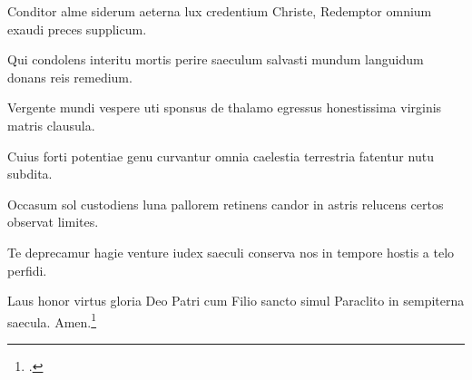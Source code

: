 Conditor alme siderum
aeterna lux credentium
Christe, Redemptor omnium
exaudi preces supplicum.

Qui condolens interitu
mortis perire saeculum
salvasti mundum languidum
donans reis remedium.

Vergente mundi vespere
uti sponsus de thalamo
egressus honestissima
virginis matris clausula.

Cuius forti potentiae
genu curvantur omnia
caelestia terrestria
fatentur nutu subdita.

Occasum sol custodiens
luna pallorem retinens
candor in astris relucens
certos observat limites.

Te deprecamur hagie
venture iudex saeculi
conserva nos in tempore
hostis a telo perfidi.

Laus honor virtus gloria
Deo Patri cum Filio
sancto simul Paraclito
in sempiterna saecula. Amen.\footcite[67r]{bp1502}
